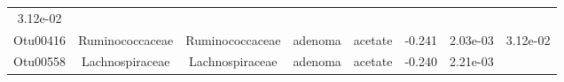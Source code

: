 \documentclass[11pt,]{article}
\begin{document}
\begin{longtable}[]{@{}cccccccc@{}}
\begin{minipage}[t]{0.08\columnwidth}
3.12e-02\strut
\end{minipage}\tabularnewline
\begin{minipage}[t]{0.08\columnwidth}\centering\strut
Otu00416\strut
\end{minipage} & \begin{minipage}[t]{0.15\columnwidth}\centering\strut
Ruminococcaceae\strut
\end{minipage} & \begin{minipage}[t]{0.15\columnwidth}\centering\strut
Ruminococcaceae\strut
\end{minipage} & \begin{minipage}[t]{0.08\columnwidth}\centering\strut
adenoma\strut
\end{minipage} & \begin{minipage}[t]{0.09\columnwidth}\centering\strut
acetate\strut
\end{minipage} & \begin{minipage}[t]{0.07\columnwidth}\centering\strut
-0.241\strut
\end{minipage} & \begin{minipage}[t]{0.08\columnwidth}\centering\strut
2.03e-03\strut
\end{minipage} & \begin{minipage}[t]{0.08\columnwidth}\centering\strut
3.12e-02\strut
\end{minipage}\tabularnewline
\begin{minipage}[t]{0.08\columnwidth}\centering\strut
Otu00558\strut
\end{minipage} & \begin{minipage}[t]{0.15\columnwidth}\centering\strut
Lachnospiraceae\strut
\end{minipage} & \begin{minipage}[t]{0.15\columnwidth}\centering\strut
Lachnospiraceae\strut
\end{minipage} & \begin{minipage}[t]{0.08\columnwidth}\centering\strut
adenoma\strut
\end{minipage} & \begin{minipage}[t]{0.09\columnwidth}\centering\strut
acetate\strut
\end{minipage} & \begin{minipage}[t]{0.07\columnwidth}\centering\strut
-0.240\strut
\end{minipage} & \begin{minipage}[t]{0.08\columnwidth}\centering\strut
2.21e-03\strut
\end{minipage} & \begin{minipage}[t]{0.08\columnwidth}\centering\strut

\end{minipage}
\end{longtable}
\end{document}
